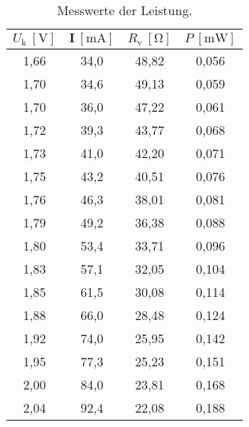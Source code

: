 \begin{table}
      \centering
      \caption{Messwerte der Leistung.}
      \label{tab:leistung}
      \begin{tabular}{ S[table-format=1.2] S[table-format=2.1] S[table-format=2.2] S[table-format=1.3]}
            \toprule
            $U_\text{k} \: [\si{\volt}]$ & $\symbf{I} \: [\si{\milli\ampere}]$ & $R_\text{v} \: [\si{\ohm}]$ & $P \: [\si{\milli\watt}]$ \\
            ,66 & 34,0 & 48,82 & 0,056 \\
            1,70 & 34,6 & 49,13 & 0,059 \\
            1,70 & 36,0 & 47,22 & 0,061 \\
            1,72 & 39,3 & 43,77 & 0,068 \\
            1,73 & 41,0 & 42,20 & 0,071 \\
            1,75 & 43,2 & 40,51 & 0,076 \\
            1,76 & 46,3 & 38,01 & 0,081 \\
            1,79 & 49,2 & 36,38 & 0,088 \\
            1,80 & 53,4 & 33,71 & 0,096 \\
            1,83 & 57,1 & 32,05 & 0,104 \\
            1,85 & 61,5 & 30,08 & 0,114 \\
            1,88 & 66,0 & 28,48 & 0,124 \\
            1,92 & 74,0 & 25,95 & 0,142 \\
            1,95 & 77,3 & 25,23 & 0,151 \\
            2,00 & 84,0 & 23,81 & 0,168 \\
            2,04 & 92,4 & 22,08 & 0,188 \\
            \bottomrule
      \end{tabular}
\end{table}
